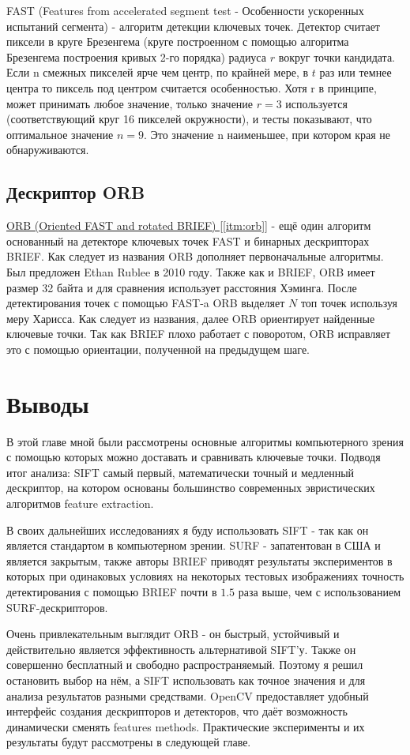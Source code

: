 FAST (Features from accelerated segment test - Особенности ускоренных испытаний сегмента) - алгоритм детекции ключевых точек. Детектор считает пиксели в круге Брезенгема (круге построенном с помощью алгоритма Брезенгема построения кривых 2-го порядка) радиуса $r$ вокруг точки кандидата. Если n смежных пикселей ярче чем центр, по крайней мере, в $t$ раз или темнее центра то пиксель под центром считается особенностью. Хотя r в принципе, может принимать любое значение, только значение $r=3$ используется (соответствующий круг 16 пикселей окружности), и тесты показывают, что оптимальное значение $n=9$. Это значение n наименьшее, при котором края не обнаруживаются.

\subsection{Дескриптор ORB}

\hyperref[itm:orb]{ ORB (Oriented FAST and rotated BRIEF) [\ref{itm:orb}]} - ещё один алгоритм основанный на детекторе ключевых точек FAST и бинарных дескрипторах BRIEF. Как следует из названия ORB дополняет первоначальные алгоритмы. Был предложен Ethan Rublee в 2010 году. Также как и BRIEF, ORB имеет размер 32 байта и для сравнения использует расстояния Хэминга. После детектирования точек с помощью FAST-a ORB выделяет $N$ топ точек используя меру Харисса. Как следует из названия, далее ORB ориентирует найденные ключевые точки. Так как BRIEF плохо работает с поворотом, ORB исправляет это с помощью ориентации, полученной на предыдущем шаге.

\section{Выводы}

В этой главе мной были рассмотрены основные алгоритмы компьютерного зрения с помощью которых можно доставать и сравнивать ключевые точки. Подводя итог анализа: SIFT самый первый, математически точный и медленный дескриптор, на котором основаны большинство современных эвристических алгоритмов feature extraction.

В своих дальнейших исследованиях я буду использовать SIFT - так как он является стандартом в компьютерном зрении. SURF - запатентован в США и является закрытым, также авторы BRIEF приводят результаты экспериментов в которых при одинаковых условиях на некоторых тестовых изображениях точность детектирования с помощью BRIEF почти в $1.5$ раза выше, чем с использованием SURF-дескрипторов.

Очень привлекательным выглядит ORB - он быстрый, устойчивый и действительно является эффективность альтернативой SIFT'у. Также он совершенно бесплатный и свободно распространяемый. Поэтому я решил остановить выбор на нём, а SIFT использовать как точное значения и для анализа результатов разными средствами. OpenCV предоставляет удобный интерфейс создания дескрипторов и детекторов, что даёт возможность динамически сменять features methods. Практические эксперименты и их результаты будут рассмотрены в следующей главе.

\newpage